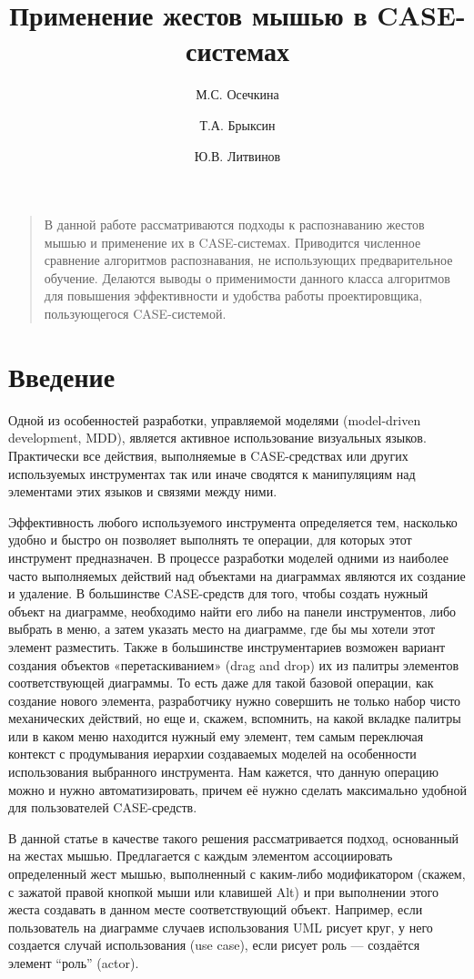 \documentclass[a5paper]{article}
\title{Применение жестов мышью в CASE-системах}
\author{М.С. Осечкина \and Т.А. Брыксин \and Ю.В. Литвинов}
\date{}
\begin{document}
\maketitle
\thispagestyle{empty}

\begin{quote}
\small\noindent
В данной работе рассматриваются подходы к распознаванию жестов мышью и применение их в CASE-системах. Приводится численное сравнение
алгоритмов распознавания, не использующих предварительное обучение. Делаются выводы о применимости данного класса алгоритмов
для повышения эффективности и удобства работы проектировщика, пользующегося CASE-системой.
\end{quote}

\section*{Введение}
Одной из особенностей разработки, управляемой моделями (model-driven development, MDD), является активное использование 
визуальных языков. Практически все действия, выполняемые в CASE-средствах или других используемых инструментах так или 
иначе сводятся к манипуляциям над элементами этих языков и связями между ними. 

Эффективность любого используемого инструмента определяется тем, насколько удобно и быстро он позволяет выполнять те операции, 
для которых этот инструмент предназначен. В процессе разработки моделей одними из наиболее часто выполняемых действий над объектами 
на диаграммах являются их создание и удаление.  В большинстве CASE-средств для того, чтобы создать нужный объект на диаграмме, 
необходимо найти его либо на панели инструментов, либо выбрать в меню, а затем указать место на диаграмме, где бы мы хотели этот 
элемент разместить. Также в большинстве инструментариев возможен вариант создания объектов «перетаскиванием» (drag and drop) их из 
палитры элементов соответствующей диаграммы. То есть даже для такой базовой операции, как создание нового элемента, разработчику нужно 
совершить не только набор чисто механических действий, но еще и, скажем, вспомнить, на какой вкладке палитры или в каком меню находится 
нужный ему элемент, тем самым переключая контекст с продумывания иерархии создаваемых моделей на особенности использования 
выбранного инструмента. Нам кажется, что данную операцию можно и нужно автоматизировать, причем её нужно сделать максимально удобной для 
пользователей CASE-средств. 

В данной статье в качестве такого решения рассматривается подход, основанный на жестах мышью. 
Предлагается с каждым элементом ассоциировать определенный жест мышью, выполненный с каким-либо модификатором (скажем, с зажатой 
правой кнопкой мыши или клавишей Alt) и при выполнении этого жеста создавать в данном месте соответствующий объект. 
Например, если пользователь на диаграмме случаев использования UML рисует круг, у него создается случай использования (use case), если рисует роль --- создаётся элемент ``роль'' (actor).
\end{document}
